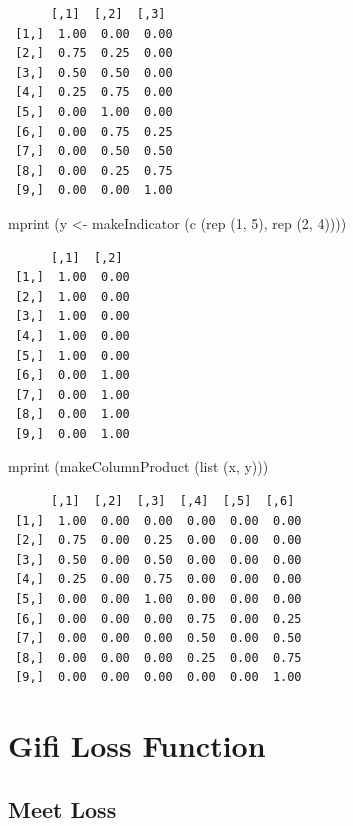 \documentclass[
  12pt,
  letterpaper,
  DIV=11,
  numbers=noendperiod]{scrreprt}
\newenvironment{Shaded}{\begin{snugshade}}{\end{snugshade}}
\newcommand{\DecValTok}[1]{\textcolor[rgb]{0.68,0.00,0.00}{#1}}
\newcommand{\FunctionTok}[1]{\textcolor[rgb]{0.28,0.35,0.67}{#1}}
\newcommand{\NormalTok}[1]{\textcolor[rgb]{0.00,0.23,0.31}{#1}}
\newcommand{\OtherTok}[1]{\textcolor[rgb]{0.00,0.23,0.31}{#1}}
\begin{document}
\begin{verbatim}
      [,1]  [,2]  [,3] 
 [1,]  1.00  0.00  0.00
 [2,]  0.75  0.25  0.00
 [3,]  0.50  0.50  0.00
 [4,]  0.25  0.75  0.00
 [5,]  0.00  1.00  0.00
 [6,]  0.00  0.75  0.25
 [7,]  0.00  0.50  0.50
 [8,]  0.00  0.25  0.75
 [9,]  0.00  0.00  1.00
\end{verbatim}

\begin{Shaded}
\begin{Highlighting}[]
\FunctionTok{mprint}\NormalTok{ (y }\OtherTok{\textless{}{-}} \FunctionTok{makeIndicator}\NormalTok{ (}\FunctionTok{c}\NormalTok{ (}\FunctionTok{rep}\NormalTok{ (}\DecValTok{1}\NormalTok{, }\DecValTok{5}\NormalTok{), }\FunctionTok{rep}\NormalTok{ (}\DecValTok{2}\NormalTok{, }\DecValTok{4}\NormalTok{))))}
\end{Highlighting}
\end{Shaded}

\begin{verbatim}
      [,1]  [,2] 
 [1,]  1.00  0.00
 [2,]  1.00  0.00
 [3,]  1.00  0.00
 [4,]  1.00  0.00
 [5,]  1.00  0.00
 [6,]  0.00  1.00
 [7,]  0.00  1.00
 [8,]  0.00  1.00
 [9,]  0.00  1.00
\end{verbatim}

\begin{Shaded}
\begin{Highlighting}[]
\FunctionTok{mprint}\NormalTok{ (}\FunctionTok{makeColumnProduct}\NormalTok{ (}\FunctionTok{list}\NormalTok{ (x, y)))}
\end{Highlighting}
\end{Shaded}

\begin{verbatim}
      [,1]  [,2]  [,3]  [,4]  [,5]  [,6] 
 [1,]  1.00  0.00  0.00  0.00  0.00  0.00
 [2,]  0.75  0.00  0.25  0.00  0.00  0.00
 [3,]  0.50  0.00  0.50  0.00  0.00  0.00
 [4,]  0.25  0.00  0.75  0.00  0.00  0.00
 [5,]  0.00  0.00  1.00  0.00  0.00  0.00
 [6,]  0.00  0.00  0.00  0.75  0.00  0.25
 [7,]  0.00  0.00  0.00  0.50  0.00  0.50
 [8,]  0.00  0.00  0.00  0.25  0.00  0.75
 [9,]  0.00  0.00  0.00  0.00  0.00  1.00
\end{verbatim}


\chapter{Gifi Loss Function}\label{gifi-loss-function}

\section{Meet Loss}\label{meet-loss}
\end{document}
